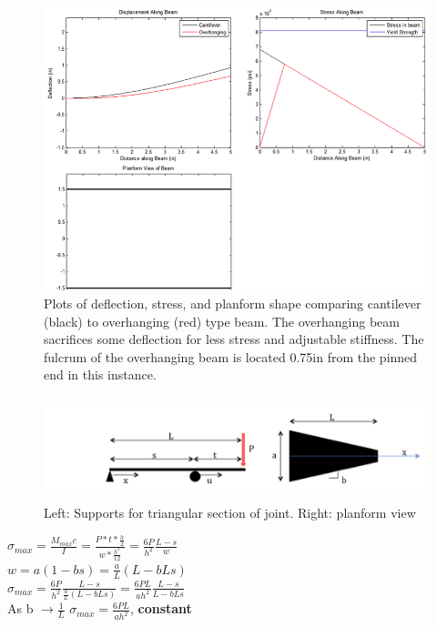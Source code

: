 \documentclass[11pt]{article}
\begin{document}
\begin{figure}[H]
\centering
\includegraphics[]{jointgraphs2.png}
\caption{Plots of deflection, stress, and planform shape comparing cantilever (black) to overhanging (red) type beam. The overhanging beam sacrifices some deflection for less stress and adjustable stiffness. The fulcrum of the overhanging beam is located 0.75in from the pinned end in this instance.}
\label{fig:jointplots2}
\end{figure}

\begin{figure}[H]
\centering
\includegraphics[width=14cm,height=3cm]{jointfbd.png}
\caption{Left: Supports for triangular section of joint. Right: planform view}
\end{figure}

\begin{center}
$\sigma_{max} = \frac{M_{max}c}{I} = \frac{P*t*\frac{h}{2}}{w*\frac{h^3}{12}} = \frac{6P}{h^2}\frac{L-s}{w}$ \\
$w = a(1-bs) = \frac{a}{L}(L-bLs)$ \\
$\sigma_{max} = \frac{6P}{h^2}\frac{L-s}{\frac{a}{L}(L-bLs)} = \frac{6PL}{ah^2}\frac{L-s}{L-bLs}$ \\
As b $\rightarrow \frac{1}{L}$ $\sigma_{max} =  \frac{6PL}{ah^2}$, \bf{constant} 
\end{center}
\end{document}
